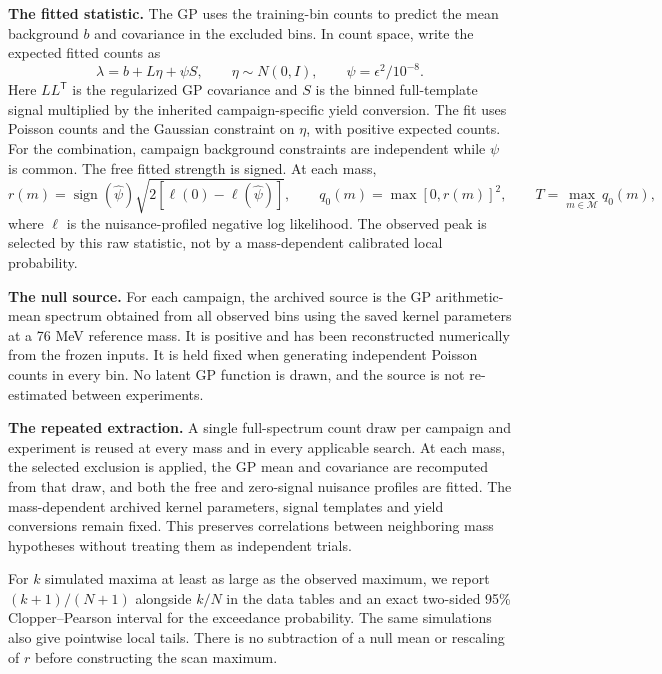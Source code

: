 \documentclass[11pt]{article}
\begin{document}
\textbf{The fitted statistic.} The GP uses the training-bin counts to predict the mean background $b$ and covariance in the excluded bins. In count space, write the expected fitted counts as
\[
 \lambda=b+L\eta+\psi S,\qquad \eta\sim N(0,I),\qquad \psi=\epsilon^2/10^{-8}.
\]
Here $LL^\mathsf{T}$ is the regularized GP covariance and $S$ is the binned full-template signal multiplied by the inherited campaign-specific yield conversion. The fit uses Poisson counts and the Gaussian constraint on $\eta$, with positive expected counts. For the combination, campaign background constraints are independent while $\psi$ is common. The free fitted strength is signed. At each mass,
\[
 r(m)=\operatorname{sign}(\widehat\psi)\sqrt{2[\ell(0)-\ell(\widehat\psi)]},
 \qquad q_0(m)=\max[0,r(m)]^2,\qquad T=\max_{m\in\mathcal M}q_0(m),
\]
where $\ell$ is the nuisance-profiled negative log likelihood. The observed peak is selected by this raw statistic, not by a mass-dependent calibrated local probability.

\textbf{The null source.} For each campaign, the archived source is the GP arithmetic-mean spectrum obtained from all observed bins using the saved kernel parameters at a 76 MeV reference mass. It is positive and has been reconstructed numerically from the frozen inputs. It is held fixed when generating independent Poisson counts in every bin. No latent GP function is drawn, and the source is not re-estimated between experiments.

\textbf{The repeated extraction.} A single full-spectrum count draw per campaign and experiment is reused at every mass and in every applicable search. At each mass, the selected exclusion is applied, the GP mean and covariance are recomputed from that draw, and both the free and zero-signal nuisance profiles are fitted. The mass-dependent archived kernel parameters, signal templates and yield conversions remain fixed. This preserves correlations between neighboring mass hypotheses without treating them as independent trials.

For $k$ simulated maxima at least as large as the observed maximum, we report $(k+1)/(N+1)$ alongside $k/N$ in the data tables and an exact two-sided 95\% Clopper--Pearson interval for the exceedance probability. The same simulations also give pointwise local tails. There is no subtraction of a null mean or rescaling of $r$ before constructing the scan maximum.
\end{document}
